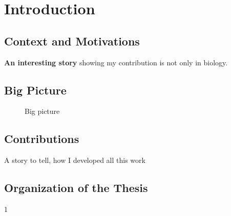 \chapter{Introduction}
\section{Context and Motivations}
\textbf{An interesting story} showing my contribution is not only in biology.
\section{Big Picture}

\begin{figure}[ht]
    \centering
    
    \caption{Big picture}
\end{figure}

\section{Contributions}
A story to tell, how I developed all this work
\section{Organization of the Thesis}
1